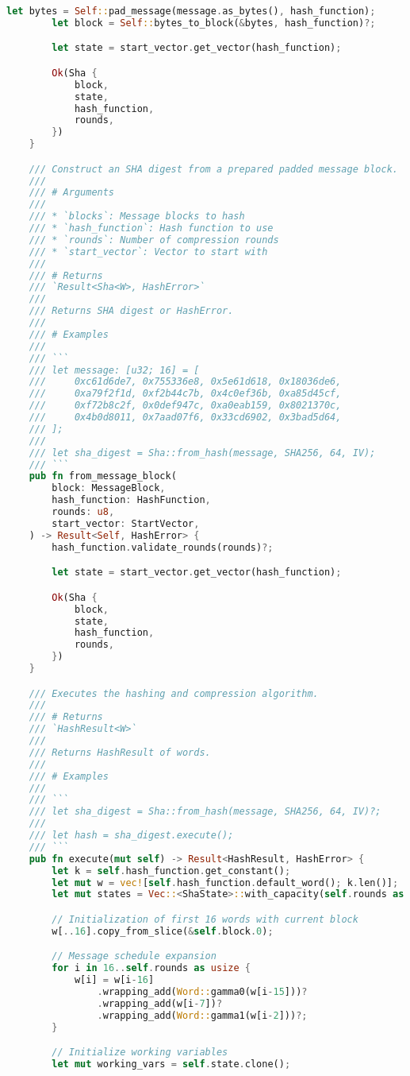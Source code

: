 \begin{lstlisting}[language=rust, caption={sha/sha.rs}]
		let bytes = Self::pad_message(message.as_bytes(), hash_function);
		let block = Self::bytes_to_block(&bytes, hash_function)?;

		let state = start_vector.get_vector(hash_function);

		Ok(Sha {
			block,
			state,
			hash_function,
			rounds,
		})
	}

	/// Construct an SHA digest from a prepared padded message block.
	///
	/// # Arguments
	///
	/// * `blocks`: Message blocks to hash
	/// * `hash_function`: Hash function to use
	/// * `rounds`: Number of compression rounds
	/// * `start_vector`: Vector to start with
	///
	/// # Returns
	/// `Result<Sha<W>, HashError>`
	///
	/// Returns SHA digest or HashError.
	///
	/// # Examples
	///
	/// ```
	/// let message: [u32; 16] = [
	/// 	0xc61d6de7, 0x755336e8, 0x5e61d618, 0x18036de6,
	/// 	0xa79f2f1d, 0xf2b44c7b, 0x4c0ef36b, 0xa85d45cf,
	/// 	0xf72b8c2f, 0x0def947c, 0xa0eab159, 0x8021370c,
	/// 	0x4b0d8011, 0x7aad07f6, 0x33cd6902, 0x3bad5d64,
	/// ];
	///
	/// let sha_digest = Sha::from_hash(message, SHA256, 64, IV);
	/// ```
	pub fn from_message_block(
		block: MessageBlock,
		hash_function: HashFunction,
		rounds: u8,
		start_vector: StartVector,
	) -> Result<Self, HashError> {
		hash_function.validate_rounds(rounds)?;

		let state = start_vector.get_vector(hash_function);

		Ok(Sha {
			block,
			state,
			hash_function,
			rounds,
		})
	}

	/// Executes the hashing and compression algorithm.
	///
	/// # Returns
	/// `HashResult<W>`
	///
	/// Returns HashResult of words.
	///
	/// # Examples
	///
	/// ```
	/// let sha_digest = Sha::from_hash(message, SHA256, 64, IV)?;
	///
	/// let hash = sha_digest.execute();
	/// ```
	pub fn execute(mut self) -> Result<HashResult, HashError> {
		let k = self.hash_function.get_constant();
		let mut w = vec![self.hash_function.default_word(); k.len()];
		let mut states = Vec::<ShaState>::with_capacity(self.rounds as usize);

		// Initialization of first 16 words with current block
		w[..16].copy_from_slice(&self.block.0);

		// Message schedule expansion
		for i in 16..self.rounds as usize {
			w[i] = w[i-16]
				.wrapping_add(Word::gamma0(w[i-15]))?
				.wrapping_add(w[i-7])?
				.wrapping_add(Word::gamma1(w[i-2]))?;
		}

		// Initialize working variables
		let mut working_vars = self.state.clone();


\end{lstlisting}
